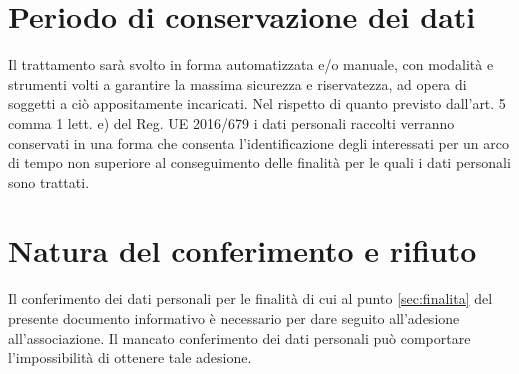 \documentclass[legalpaper, 11pt]{exam}
\begin{document}
{\section{Periodo di conservazione dei dati}
Il trattamento sarà svolto in forma automatizzata e/o manuale, con modalità e strumenti volti a garantire la massima sicurezza e riservatezza, ad opera di soggetti a ciò appositamente incaricati.
Nel rispetto di quanto previsto dall’art. 5 comma 1 lett. e) del Reg. UE 2016/679 i dati personali raccolti verranno conservati in una forma che consenta l’identificazione degli interessati per un arco di tempo non superiore al conseguimento delle finalità per le quali i dati personali sono trattati.

\section{Natura del conferimento e rifiuto}
Il conferimento dei dati personali per le finalità di cui al punto \ref{sec:finalita} del presente documento informativo è necessario per dare seguito all’adesione all’associazione. Il mancato conferimento dei dati personali può comportare l’impossibilità di ottenere tale adesione.

}
\end{document}
